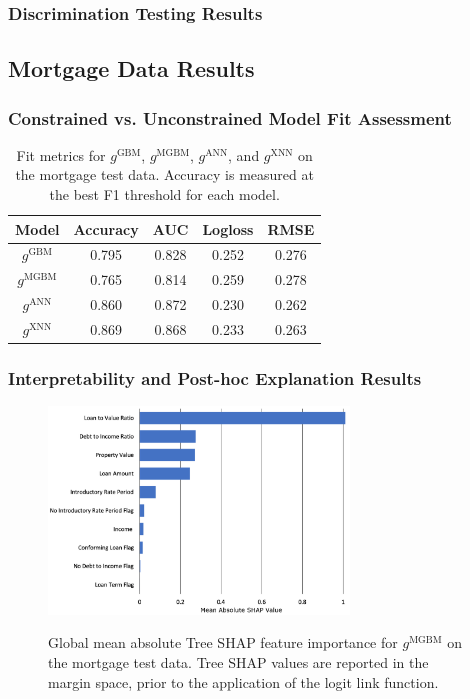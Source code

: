\documentclass[information,article,submit,moreauthors,pdftex]{definitions/mdpi}
\begin{document}
\subsubsection{Discrimination Testing Results}

\subsection{Mortgage Data Results}

\subsubsection{Constrained vs. Unconstrained Model Fit Assessment}

\begin{table}[H]
\label{tab:mort_acc}
\caption{Fit metrics for $g^\text{GBM}$, $g^\text{MGBM}$, $g^\text{ANN}$, and $g^\text{XNN}$ on the mortgage test data. Accuracy is measured at the best F1 threshold for each model.}
\centering
\begin{tabular}{ccccc}
\toprule
\textbf{Model}		& \textbf{Accuracy}	& \textbf{AUC}	 & \textbf{Logloss}	& \textbf{RMSE}\\
\midrule	
$g^\text{GBM}$		& 0.795	& 0.828	& 0.252	& 0.276 \\
$g^\text{MGBM}$	& 0.765	& 0.814	& 0.259	& 0.278 \\
$g^\text{ANN}$		& 0.860	& 0.872 	& 0.230 	& 0.262 \\
$g^\text{XNN}$		& 0.869	& 0.868	& 0.233	& 0.263 \\
\bottomrule
\end{tabular}
\end{table}

\subsubsection{Interpretability and Post-hoc Explanation Results}

\begin{figure}[H]
\centering
\includegraphics[width=8cm]{img/mort_mgbm_glob.png}
\label{fig:mort_mgbm_glob}
\caption{Global mean absolute Tree SHAP feature importance for $g^\text{MGBM}$ on the mortgage test data. Tree SHAP values are reported in the margin space, prior to the application of the logit link function.}
\end{figure} 
\end{document}
